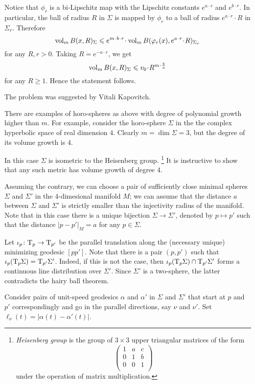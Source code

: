Notice that $\phi_r$ is a bi-Lipschitz map with the Lipschitz constants $e^{a\cdot r}$ and $e^{b\cdot r}$.
In particular, the ball of radius $R$ in $\Sigma$ is mapped by $\phi_r$
to a ball of radius $e^{a\cdot r}\cdot R$ in $\Sigma_r$.
Therefore
\[\vol_m B(x,R)_\Sigma
\le 
e^{m\cdot b\cdot r}\cdot \vol_m B(\phi_r(x),e^{a\cdot r}\cdot R)_{\Sigma_r}\]
for any $R,r>0$.
Taking $R=e^{-a\cdot r}$, we get
\[\vol_m B(x,R)_\Sigma\le v_0\cdot R^{m\cdot \frac ba}\]
for any $R\ge1$. 
Hence the statement follows.
\qeds

The problem was suggested by Vitali Kapovitch.

There are examples of horo-spheres as above with degree of polynomial growth higher than $m$.
For example, consider the horo-sphere $\Sigma$ in the
the complex hyperbolic space 
of real dimension $4$.
Clearly $m=\dim \Sigma=3$, but the degree of its volume growth is $4$.

In this case $\Sigma$ is isometric to the Heisenberg group.%
\footnote{\emph{Heisenberg group}
is the group of $3\times3$ upper triangular matrices of the form
\[\begin{pmatrix}
 1 & a & c\\
 0 & 1 & b\\
 0 & 0 & 1\\
\end{pmatrix}\]
under the operation of matrix multiplication.} 
It is instructive to show that any such metric has volume  growth of degree $4$.

Assuming the contrary,
we can choose a pair of sufficiently close minimal spheres $\Sigma$ and $\Sigma'$ in the 4-dimesional manifold $M$;
we can assume that the distance $a$ between $\Sigma$ and $\Sigma'$ is strictly smaller than the injectivity radius of the manifold.
Note that in this case there is a unique bijection $\Sigma\to \Sigma'$, denoted by $p\mapsto p'$ such that the distance $|p-p'|_M=a$ for any $p\in\Sigma$.

Let $\iota_p\colon\mathrm{T}_p\to\mathrm{T}_{p'}$ be the parallel translation along the (necessary unique) minimizing geodesic $[pp']$.
Note that there is a pair $(p,p')$ such that $\iota_p(\mathrm{T}_p\Sigma)=\mathrm{T}_{p'}\Sigma'$.
Indeed, if this is not the case, then $\iota_p(\mathrm{T}_p\Sigma)\cap\mathrm{T}_{p'}\Sigma'$ forms a continuous line distribution over $\Sigma'$.
Since $\Sigma'$ is a two-sphere, the latter contradicts the hairy ball theorem.

Consider pairs of unit-speed geodesics $\alpha$ and $\alpha'$ 
in $\Sigma$ and $\Sigma'$  
that start at $p$ and $p'$ correspondingly
and go in the parallel directions, say $\nu$ and $\nu'$. 
Set $\ell_\nu(t)=|\alpha(t)-\alpha'(t)|$.

